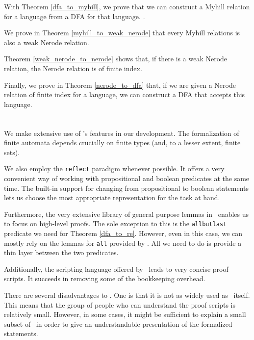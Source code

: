 With Theorem \ref{dfa_to_myhill}, we prove that we can construct a Myhill relation for a language from a DFA for that language.
.

We prove in Theorem \ref{myhill_to_weak_nerode} that every Myhill relations is also a weak Nerode relation.

Theorem \ref{weak_nerode_to_nerode} shows that, if there is a weak Nerode relation, the Nerode relation is of finite index.

Finally, we prove in Theorem \ref{nerode_to_dfa} that, if we are given a Nerode relation of finite index for a language, we can construct a DFA that accepts this language.

\section{\ssreflect}
We make extensive use of \ssreflect's features in our development.
The formalization of finite automata depends crucially on finite types (and, to a lesser extent, finite sets).

We also employ the \lstinline{reflect} paradigm whenever possible.
It offers a very convenient way of working with propositional and boolean predicates at the same time.
The built-in support for changing from propositional to boolean statements lets us choose the most appropriate representation for the task at hand.


Furthermore, the very extensive library of general purpose lemmas in \ssreflect\ enables us to focus on high-level proofs. 
The sole exception to this is the \lstinline{allbutlast} predicate we need for Theorem \ref{dfa_to_re}.
However, even in this case, we can mostly rely on the lemmas for \lstinline{all} provided by \ssreflect.
All we need to do is provide a thin layer between the two predicates.

Additionally, the scripting language offered by \ssreflect\ leads to very concise proof scripts. 
It succeeds in removing some of the bookkeeping overhead. %

There are several disadvantages to \ssreflect. 
One is that it is not as widely used as \coq\ itself. 
This means that the group of people who can understand the 
proof scripts is relatively small.
However, in some cases, it might be sufficient to explain a small subset of
\ssreflect\ in order to give an understandable presentation of the formalized statements. 


